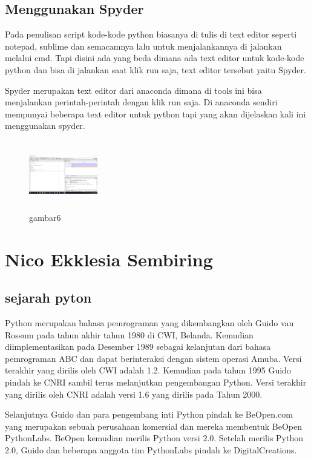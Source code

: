 \subsection{Menggunakan Spyder}
Pada penulisan script kode-kode python biasanya di tulis di text editor seperti notepad, sublime dan semacamnya lalu untuk menjalankannya di jalankan melalui cmd. Tapi disini ada yang beda dimana ada text editor untuk kode-kode python dan bisa di jalankan saat klik run saja, text editor tersebut yaitu Spyder.
\par Spyder merupakan text editor dari anaconda dimana di tools ini bisa menjalankan perintah-perintah dengan klik run saja. Di anaconda sendiri mempunyai beberapa text editor untuk python tapi yang akan dijelaskan kali ini menggunakan spyder.
\begin{figure}[!htbp]
    \centering
    \includegraphics[width=3cm,height=3cm]{figures/choi/6.png}
    \caption{gambar6}
    \label{spyder}
    \end{figure}
	



\section{Nico Ekklesia Sembiring}
\subsection{sejarah pyton}
Python merupakan bahasa pemrograman yang dikembangkan oleh Guido van Rossum pada tahun akhir tahun 1980 di CWI, Belanda. Kemudian diimplementasikan pada Desember 1989 sebagai kelanjutan dari bahasa pemrograman ABC dan dapat berinteraksi dengan sistem operasi Amuba. Versi terakhir yang dirilis oleh CWI adalah 1.2. Kemudian pada tahun 1995 Guido pindah ke CNRI sambil terus melanjutkan pengembangan Python. Versi terakhir yang dirilis oleh CNRI adalah versi 1.6 yang dirilis pada Tahun 2000. 

Selanjutnya Guido dan para pengembang inti Python pindah ke BeOpen.com yang merupakan sebuah perusahaan komersial dan mereka membentuk BeOpen PythonLabs. BeOpen kemudian merilis Python versi 2.0. Setelah merilis Python 2.0, Guido dan beberapa anggota tim PythonLabs pindah ke DigitalCreations. 

